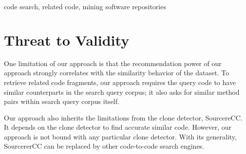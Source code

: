 \documentclass[conference]{IEEEtran}
\begin{document}
\begin{abstract}

\end{abstract}

\begin{IEEEkeywords}
code search, related code, mining software repositories
\end{IEEEkeywords}











\section{Threat to Validity}
One limitation of our approach is that the recommendation power of our approach strongly correlates with the similarity behavior of the dataset. To retrieve related code fragments, our approach requires the query code to have similar counterparts in the search query corpus; it also asks for similar method pairs within search query corpus itself. 

Our approach also inherits the limitations from the clone detector, SourcereCC. It depends on the clone detector to find accurate similar code. However, our approach is not bound with any particular clone detector. With its generality, SourcererCC can be replaced by other code-to-code search engines. 
\end{document}
